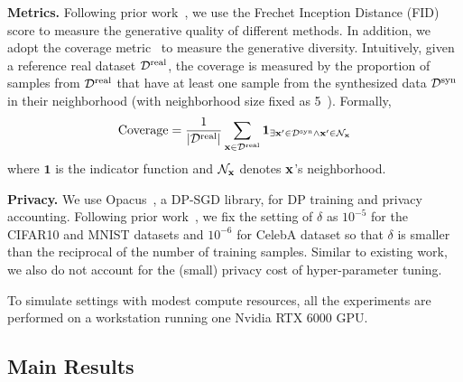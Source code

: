 {\bf Metrics.} Following prior work~\citep{dockhorn2022differentially,lyu2023differentially}, we use the Frechet Inception Distance (FID) score to measure the generative quality of different methods. In addition, we adopt the coverage metric~\citep{naeem2020reliable} to measure the generative diversity. Intuitively, given a reference real dataset ${\mathcal{D}}^\mathrm{real}$, the coverage is measured by the proportion of samples from ${\mathcal{D}}^\mathrm{real}$ that have at least one sample from the synthesized data ${\mathcal{D}}^\mathrm{syn}$ in their neighborhood (with neighborhood size fixed as 5~\citep{lebensold2024dp}). Formally, 
\begin{equation}
\text{Coverage} = \frac{1}{|{\mathcal{D}}^\mathrm{real}|} \sum_{{\mathbf{x}} \in {\mathcal{D}}^\mathrm{real}} \bm{1}_{\exists {\mathbf{x}}' \in {\mathcal{D}}^\mathrm{syn} \wedge {\mathbf{x}}' \in {\mathcal{N}}_{\mathbf{x}}}
\end{equation}
where $\bm{1}$ is the indicator function and ${\mathcal{N}}_{\mathbf{x}}$ denotes ${\mathbf{x}}$'s neighborhood.

{\bf Privacy.} We use {\sc Opacus}~\citet{opacus}, a DP-SGD library, for DP training and privacy accounting. Following prior work~\citep{dockhorn2022differentially}, we fix the setting of $\delta$ as $10^{-5}$ for the CIFAR10 and MNIST datasets and $10^{-6}$ for CelebA dataset so that $\delta$ is smaller than the reciprocal of the number of training samples. Similar to existing work, we also do not account for the (small) privacy cost of hyper-parameter tuning.

To simulate settings with modest compute resources, all the experiments are performed on a workstation running one Nvidia RTX 6000 GPU. 

\subsection{Main Results}

